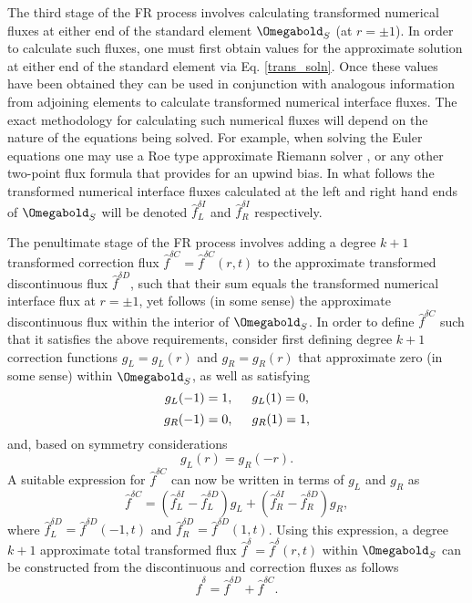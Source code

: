 The third stage of the FR process involves calculating transformed numerical fluxes at either end of the standard element $\Omegabold_S$ (at $r=\pm 1$). In order to calculate such fluxes, one must first obtain values for the approximate solution at either end of the standard element via Eq. \eqref{trans_soln}. Once these values have been obtained they can be used in conjunction with analogous information from adjoining elements to calculate transformed numerical interface fluxes. The exact methodology for calculating such numerical fluxes will depend on the nature of the equations being solved. For example, when solving the Euler equations one may use a Roe type approximate Riemann solver \cite{roe81}, or any other two-point flux formula that provides for an upwind bias. In what follows the transformed numerical interface fluxes calculated at the left and right hand ends of $\Omegabold_S$ will be denoted $\hat{f}^{\delta I}_L$ and $\hat{f}^{\delta I}_R$ respectively.

The penultimate stage of the FR process involves adding a degree $k+1$ transformed correction flux $\hat{f}^{\delta C}=\hat{f}^{\delta C}(r,t)$ to the approximate transformed discontinuous flux $\hat{f}^{\delta D}$, such that their sum equals the transformed numerical interface flux at $r=\pm 1$, yet follows (in some sense) the approximate discontinuous flux within the interior of $\Omegabold_S$. In order to define $\hat{f}^{\delta C}$ such that it satisfies the above requirements, consider first defining degree $k+1$ correction functions $g_L=g_L(r)$ and $g_R=g_R(r)$ that approximate zero (in some sense) within $\Omegabold_S$, as well as satisfying 
\begin{equation}
g_L(-1)=1,\hspace{0.5cm}g_L(1)=0,
\label{gL_BCs}
\end{equation}
\begin{equation}
g_R(-1)=0,\hspace{0.5cm}g_R(1)=1,
\end{equation}
and, based on symmetry considerations
\begin{equation}
g_L(r)=g_R(-r).
\end{equation}
A suitable expression for $\hat{f}^{\delta C}$ can now be written in terms of $g_L$ and $g_R$ as
\begin{equation}
\hat{f}^{\delta C}=(\hat{f}^{\delta I}_L-\hat{f}^{\delta D}_L)g_L+(\hat{f}^{\delta I}_R-\hat{f}^{\delta D}_R)g_R,
\end{equation}
where $\hat{f}^{\delta D}_L=\hat{f}^{\delta D}(-1,t)$ and $\hat{f}^{\delta D}_R=\hat{f}^{\delta D}(1,t)$. Using this expression, a degree $k+1$ approximate total transformed flux $\hat{f}^{\delta}=\hat{f}^{\delta}(r,t)$ within $\Omegabold_S$ can be constructed from the discontinuous and correction fluxes as follows
\begin{equation}
\hat{f}^{\delta}=\hat{f}^{\delta D}+\hat{f}^{\delta C}.
\end{equation}

